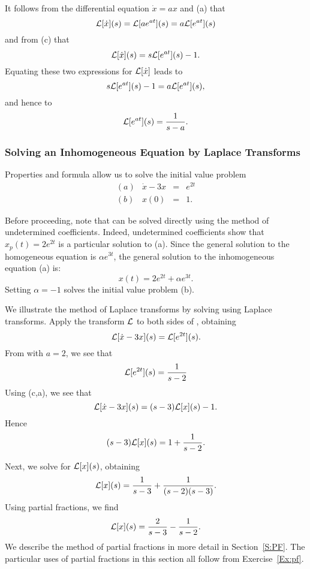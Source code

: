 \documentclass{ximera}
\begin{document}
It follows from the differential equation $\dot{x}=ax$ and (a) 
that
\[
{\cal L}[\dot{x}](s) = {\cal L}[ae^{at}](s) = a{\cal L}[e^{at}](s)
\]
and from (c) that
\[
{\cal L}[\dot{x}](s) = s{\cal L}[e^{at}](s)-1.
\]
Equating these two expressions for ${\cal L}[\dot{x}]$ leads to
\[
s{\cal L}[e^{at}](s)-1 = a{\cal L}[e^{at}](s),
\]
and hence to 
\begin{equation} \label{eq:Lexp}
{\cal L}[e^{at}](s) = \frac{1}{s-a}.
\end{equation}

\subsubsection*{Solving an Inhomogeneous Equation by Laplace Transforms}

Properties  and formula  allow us to solve the 
initial value problem 
\begin{equation} \label{eq:expODE}
\begin{array}{crcl}
(a) & \dot{x} - 3x & = & e^{2t}\\
(b) & x(0) & = & 1.
\end{array}
\end{equation}

Before proceeding, note that  can be solved directly using
the method of undetermined coefficients.    
Indeed, undetermined coefficients show that $x_p(t) = 2e^{2t}$ is a 
particular solution to (a).  Since the general solution to the 
homogeneous equation is $\alpha e^{3t}$, the general solution to the 
inhomogeneous equation (a) is:
\[
x(t) = 2e^{2t} + \alpha e^{3t}.
\]
Setting $\alpha=-1$ solves the initial value problem (b).

We illustrate the method of Laplace transforms by solving  
using Laplace transforms.  Apply the transform ${\cal L}$ to both sides of 
, obtaining 
\[
{\cal L}[\dot{x}-3x](s) = {\cal L}[e^{2t}](s).
\]
From  with $a=2$, we see that
\[
{\cal L}[e^{2t}](s) = \frac{1}{s-2}
\]
Using (c,a), we see that  
\[
{\cal L}[\dot{x}-3x](s) = (s-3){\cal L}[x](s) - 1.
\]
Hence 
\[
(s-3){\cal L}[x](s) = 1 + \frac{1}{s-2}.
\]

Next, we solve for ${\cal L}[x](s)$, obtaining
\[
{\cal L}[x](s) = \frac{1}{s-3} + \frac{1}{(s-2)(s-3)}.
\]
Using partial fractions, we find  
\[
{\cal L}[x](s)  = \frac{2}{s-3} - \frac{1}{s-2}.
\]
We describe the method of partial fractions in more detail in 
Section~\ref{S:PF}.  The particular uses of partial fractions in this section 
all follow from Exercise~\ref{Ex:pf}. 
\end{document}
